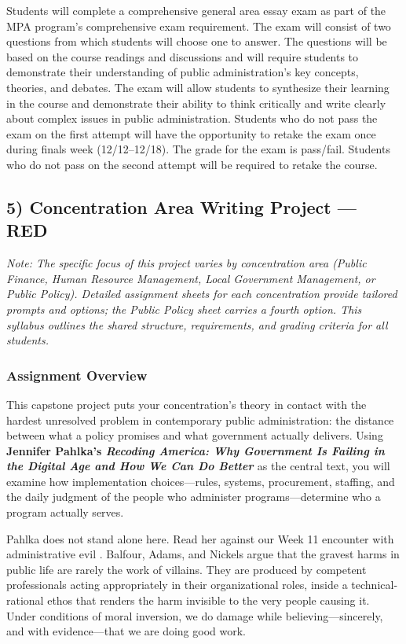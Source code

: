 \documentclass[11pt]{article}     %
\begin{document}
Students will complete a comprehensive general area essay exam as part of the MPA program's comprehensive exam requirement. The exam will consist of two questions from which students will choose one to answer. The questions will be based on the course readings and discussions and will require students to demonstrate their understanding of public administration's key concepts, theories, and debates. The exam will allow students to synthesize their learning in the course and demonstrate their ability to think critically and write clearly about complex issues in public administration. Students who do not pass the exam on the first attempt will have the opportunity to retake the exam once during finals week (12/12--12/18). The grade for the exam is pass/fail. Students who do not pass on the second attempt will be required to retake the course.

\subsection*{5) Concentration Area Writing Project --- RED}

\noindent \textit{Note: The specific focus of this project varies by concentration area (Public Finance, Human Resource Management, Local Government Management, or Public Policy). Detailed assignment sheets for each concentration provide tailored prompts and options; the Public Policy sheet carries a fourth option. This syllabus outlines the shared structure, requirements, and grading criteria for all students.}

\subsubsection*{Assignment Overview}

This capstone project puts your concentration's theory in contact with the hardest unresolved problem in contemporary public administration: the distance between what a policy promises and what government actually delivers. Using \textbf{Jennifer Pahlka's \textit{Recoding America: Why Government Is Failing in the Digital Age and How We Can Do Better} \citeyearpar{pahlka2023}} as the central text, you will examine how implementation choices---rules, systems, procurement, staffing, and the daily judgment of the people who administer programs---determine who a program actually serves.

Pahlka does not stand alone here. Read her against our Week 11 encounter with administrative evil \citep{balfour2020}. Balfour, Adams, and Nickels argue that the gravest harms in public life are rarely the work of villains. They are produced by competent professionals acting appropriately in their organizational roles, inside a technical-rational ethos that renders the harm invisible to the very people causing it. Under conditions of moral inversion, we do damage while believing---sincerely, and with evidence---that we are doing good work.
\end{document}

